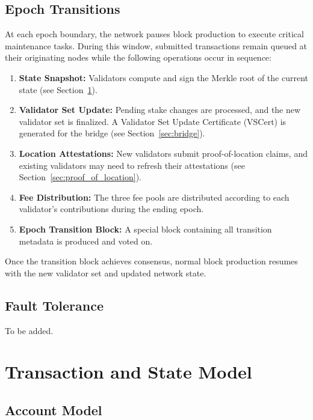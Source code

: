 \documentclass{article}
\begin{document}
\subsection{Epoch Transitions}
\label{sec:epoch_transitions}

At each epoch boundary, the network pauses block production to execute critical maintenance tasks. During this window, submitted transactions remain queued at their originating nodes while the following operations occur in sequence:

\begin{enumerate}
    \item \textbf{State Snapshot:} Validators compute and sign the Merkle root of the current state (see Section~\ref{sec:transaction_state}).
    \item \textbf{Validator Set Update:} Pending stake changes are processed, and the new validator set is finalized. A Validator Set Update Certificate (VSCert) is generated for the bridge (see Section~\ref{sec:bridge}).
    \item \textbf{Location Attestations:} New validators submit proof-of-location claims, and existing validators may need to refresh their attestations (see Section~\ref{sec:proof_of_location}).
    \item \textbf{Fee Distribution:} The three fee pools are distributed according to each validator's contributions during the ending epoch.
    \item \textbf{Epoch Transition Block:} A special block containing all transition metadata is produced and voted on.
\end{enumerate}

Once the transition block achieves consensus, normal block production resumes with the new validator set and updated network state.

\subsection{Fault Tolerance}

To be added.

\section{Transaction and State Model}
\label{sec:transaction_state}

\subsection{Account Model}
\label{sec:account_model}
\end{document}
